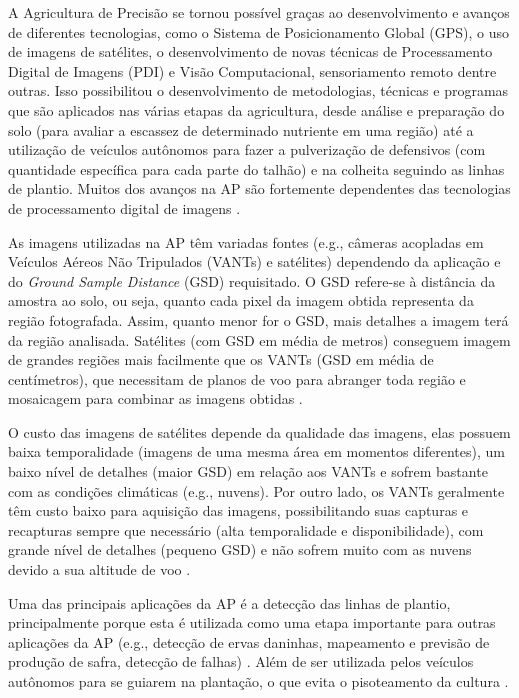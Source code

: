 \documentclass[12pt, a4paper, english, brazil]{article}
\begin{document}
A Agricultura de Precisão se tornou possível graças ao desenvolvimento e avanços de diferentes tecnologias, como o Sistema de Posicionamento Global (GPS), o uso de imagens de satélites, o desenvolvimento de novas técnicas de Processamento Digital de Imagens (PDI) e Visão Computacional, sensoriamento remoto dentre outras. Isso possibilitou o desenvolvimento de metodologias, técnicas e programas que são aplicados nas várias etapas da agricultura, desde análise e preparação do solo (para avaliar a escassez de determinado nutriente em uma região) até a utilização de veículos autônomos para fazer a pulverização de defensivos (com quantidade específica para cada parte do talhão) e na colheita seguindo as linhas de plantio. Muitos dos avanços na AP são fortemente dependentes das tecnologias de processamento digital de imagens \cite{Bolfe_2020}.

As imagens utilizadas na AP têm variadas fontes (e.g., câmeras acopladas em Veículos Aéreos Não Tripulados (VANTs) e satélites) dependendo da aplicação e do \textit{Ground Sample Distance} (GSD) requisitado. O GSD refere-se à distância da amostra ao solo, ou seja, quanto cada pixel da imagem obtida representa da região fotografada. Assim, quanto menor for o GSD, mais detalhes a imagem terá da região analisada. Satélites (com GSD em média de metros) conseguem imagem de grandes regiões mais facilmente que os VANTs (GSD em média de centímetros), que necessitam de planos de voo para abranger toda região e mosaicagem para combinar as imagens obtidas \cite{Messina_2020}.

O custo das imagens de satélites depende da qualidade das imagens, elas possuem baixa temporalidade (imagens de uma mesma área em momentos diferentes), um baixo nível de detalhes (maior GSD) em relação aos VANTs e sofrem bastante com as condições climáticas (e.g., nuvens). Por outro lado, os VANTs geralmente têm custo baixo para aquisição das imagens, possibilitando suas capturas e recapturas sempre que necessário (alta temporalidade e disponibilidade), com grande nível de detalhes (pequeno GSD) e não sofrem muito com as nuvens devido a sua altitude de voo \cite{Candiago_2015, Delavarpour_2021}.

Uma das principais aplicações da AP é a detecção das linhas de plantio, principalmente porque esta é utilizada como uma etapa importante para outras aplicações da AP (e.g., detecção de ervas daninhas, mapeamento e previsão de produção de safra, detecção de falhas) \cite{Hassanein_2019}. Além de ser utilizada pelos veículos autônomos para se guiarem na plantação, o que evita o pisoteamento da cultura \cite{Doha_2021}.
\end{document}

